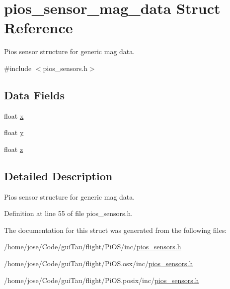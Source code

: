 \hypertarget{structpios__sensor__mag__data}{\section{pios\-\_\-sensor\-\_\-mag\-\_\-data Struct Reference}
\label{structpios__sensor__mag__data}
}


Pios sensor structure for generic mag data.  




{\ttfamily \#include $<$pios\-\_\-sensors.\-h$>$}

\subsection*{Data Fields}
\begin{DoxyCompactItemize}
\item 
float \hyperlink{group___p_i_o_s___s_e_n_s_o_r_s_ga3ec7375b9b8c7ab5ddd50349c76ac818}{x}
\item 
float \hyperlink{group___p_i_o_s___s_e_n_s_o_r_s_ga04a14fcd48fda39a469229e1b01c0b2d}{y}
\item 
float \hyperlink{group___p_i_o_s___s_e_n_s_o_r_s_ga77b8adea9b5e8b43c3ce7d4c60784862}{z}
\end{DoxyCompactItemize}


\subsection{Detailed Description}
Pios sensor structure for generic mag data. 

Definition at line 55 of file pios\-\_\-sensors.\-h.



The documentation for this struct was generated from the following files\-:\begin{DoxyCompactItemize}
\item 
/home/jose/\-Code/gui\-Tau/flight/\-Pi\-O\-S/inc/\hyperlink{inc_2pios__sensors_8h}{pios\-\_\-sensors.\-h}\item 
/home/jose/\-Code/gui\-Tau/flight/\-Pi\-O\-S.\-osx/inc/\hyperlink{osx_2inc_2pios__sensors_8h}{pios\-\_\-sensors.\-h}\item 
/home/jose/\-Code/gui\-Tau/flight/\-Pi\-O\-S.\-posix/inc/\hyperlink{posix_2inc_2pios__sensors_8h}{pios\-\_\-sensors.\-h}\end{DoxyCompactItemize}
